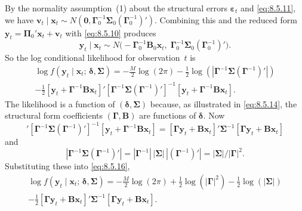 By the normality assumption~(1) about the structural errors $\boldsymbol{\varepsilon}_t$ and
\eqref{eq:8.5.11},
we have $\mathbf{v}_t \mid \mathbf{x}_t \sim N(\mathbf{0},
\boldsymbol{\Gamma}_0^{-1}\boldsymbol{\Sigma}_0(\boldsymbol{\Gamma}_0^{-1})')$.
Combining this and the reduced form
$\mathbf{y}_t = \boldsymbol{\Pi}_0'\mathbf{x}_t + \mathbf{v}_t$ with \eqref{eq:8.5.10} produces
\begin{equation}
  \mathbf{y}_t \mid \mathbf{x}_t \sim
  N\bigl(-\boldsymbol{\Gamma}_0^{-1}\mathbf{B}_0\mathbf{x}_t,\;
    \boldsymbol{\Gamma}_0^{-1}\boldsymbol{\Sigma}_0(\boldsymbol{\Gamma}_0^{-1})'\bigr).
  \label{eq:8.5.15} \tag{8.5.15}
\end{equation}
So the log conditional likelihood for observation~$t$ is
\begin{multline}
  \log f(\mathbf{y}_t \mid \mathbf{x}_t;\, \boldsymbol{\delta}, \boldsymbol{\Sigma})
  = -\frac{M}{2}\log(2\pi)
    - \frac{1}{2}\log(|\boldsymbol{\Gamma}^{-1}\boldsymbol{\Sigma}(\boldsymbol{\Gamma}^{-1})'|)
    \\
    - \frac{1}{2}[\mathbf{y}_t + \boldsymbol{\Gamma}^{-1}\mathbf{B}\mathbf{x}_t]'
      [\boldsymbol{\Gamma}^{-1}\boldsymbol{\Sigma}(\boldsymbol{\Gamma}^{-1})']^{-1}
      [\mathbf{y}_t + \boldsymbol{\Gamma}^{-1}\mathbf{B}\mathbf{x}_t].
  \label{eq:8.5.16} \tag{8.5.16}
\end{multline}
The likelihood is a function of $(\boldsymbol{\delta}, \boldsymbol{\Sigma})$ because, as illustrated in \eqref{eq:8.5.14}, the structural form coefficients $(\boldsymbol{\Gamma}, \mathbf{B})$ are functions of $\boldsymbol{\delta}$. Now
\begin{equation}
  [\mathbf{y}_t + \boldsymbol{\Gamma}^{-1}\mathbf{B}\mathbf{x}_t]'
  [\boldsymbol{\Gamma}^{-1}\boldsymbol{\Sigma}(\boldsymbol{\Gamma}^{-1})']^{-1}
  [\mathbf{y}_t + \boldsymbol{\Gamma}^{-1}\mathbf{B}\mathbf{x}_t]
  = [\boldsymbol{\Gamma}\mathbf{y}_t + \mathbf{B}\mathbf{x}_t]'
    \boldsymbol{\Sigma}^{-1}
    [\boldsymbol{\Gamma}\mathbf{y}_t + \mathbf{B}\mathbf{x}_t]
  \label{eq:8.5.17} \tag{8.5.17}
\end{equation}
and
\begin{equation}
  |\boldsymbol{\Gamma}^{-1}\boldsymbol{\Sigma}(\boldsymbol{\Gamma}^{-1})'|
  = |\boldsymbol{\Gamma}^{-1}| \,|\boldsymbol{\Sigma}|\, |(\boldsymbol{\Gamma}^{-1})'|
  = |\boldsymbol{\Sigma}|/|\boldsymbol{\Gamma}|^2.
  \label{eq:8.5.18} \tag{8.5.18}
\end{equation}
Substituting these into \eqref{eq:8.5.16},
\begin{multline}
  \log f(\mathbf{y}_t \mid \mathbf{x}_t;\, \boldsymbol{\delta}, \boldsymbol{\Sigma})
  = -\frac{M}{2}\log(2\pi)
    + \frac{1}{2}\log(|\boldsymbol{\Gamma}|^2)
    - \frac{1}{2}\log(|\boldsymbol{\Sigma}|) \\
    - \frac{1}{2}[\boldsymbol{\Gamma}\mathbf{y}_t + \mathbf{B}\mathbf{x}_t]'
      \boldsymbol{\Sigma}^{-1}
      [\boldsymbol{\Gamma}\mathbf{y}_t + \mathbf{B}\mathbf{x}_t].
  \label{eq:8.5.19} \tag{8.5.19}
\end{multline}
